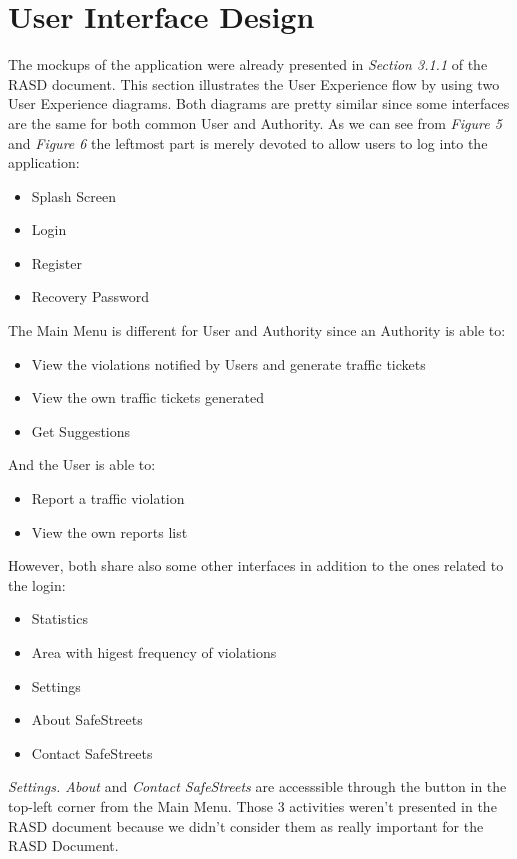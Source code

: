 \section{User Interface Design}
  The mockups of the application were already presented in \textit{Section 3.1.1} of the RASD document. This section illustrates the User Experience flow by using two User Experience diagrams. Both diagrams are pretty similar since some interfaces are the same for both common User and Authority. As we can see from \textit{Figure 5} and \textit{Figure 6} the leftmost part is merely devoted to allow users to log into the application:
\begin{itemize}
\item Splash Screen%
\item Login%
\item Register
\item Recovery Password
\end{itemize}
\vspace{4mm}
The Main Menu is different for User and Authority since an Authority is able to:
\begin{itemize}
\item View the violations notified by Users and generate traffic tickets
\item View the own traffic tickets generated
\item Get Suggestions
\end{itemize}
And the User is able to:
\begin{itemize}
\item Report a traffic violation
\item View the own reports list
\end{itemize}
However, both share also some other interfaces in addition to the ones related to the login:
\begin{itemize}
    \item Statistics
    \item Area with higest frequency of violations
    \item Settings
    \item About SafeStreets
    \item Contact SafeStreets
\end{itemize}
\textit{Settings. About} and \textit{Contact SafeStreets} are accesssible through the button in the top-left corner from the Main Menu. Those 3 activities weren't presented in the RASD document because we didn't consider them as really important for the RASD Document. 
